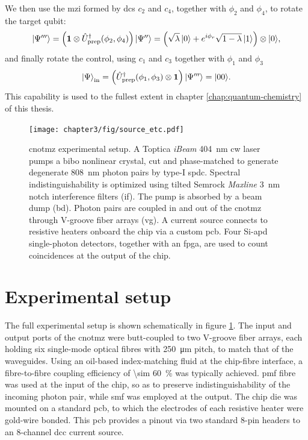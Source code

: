We then use the \gls{mzi} formed by \glspl{dc} $c_2$ and $c_4$, together with $\phi_2$ and $\phi_4$, to rotate the target qubit:
\begin{equation}
   \mbox{$ | \Psi''' \rangle $} = 
   \left(
   \mathbf{1}
   \otimes
   \hat{U}_\mathrm{prep}^\dagger(\phi_2, \phi_4) 
   \right)\mbox{$ | \Psi'' \rangle $}  
    = \left( \sqrt{\lambda} \, \mbox{$ | 0 \rangle $} 
    + e^{i \phi_r}\sqrt{1-\lambda} \, \mbox{$ | 1 \rangle $} \right) \otimes \mbox{$ | 0 \rangle $},
\end{equation}
and finally rotate the control, using $c_1$ and $c_3$ together with $\phi_1$ and $\phi_3$
\begin{equation}
    \mbox{$ | \Psi \rangle $}_{\mathrm{in}} = 
   \left( 
   \hat{U}_\mathrm{prep}^\dagger(\phi_1, \phi_3) 
   \otimes 
   \mathbf{1} 
   \right) \mbox{$ | \Psi''' \rangle $}  
   = \mbox{$ | 00 \rangle $}.
\end{equation}
This capability is used to the fullest extent in chapter \ref{chap:quantum-chemistry} of this thesis.

\begin{figure}[t!]
\centering
\texttt{[image: chapter3/fig/source\_etc.pdf]}
\caption[Experimental setup]
{ \gls{cnotmz} experimental setup.  A Toptica \emph{iBeam} \SI{404}{\nano \metre} \gls{cw} laser pumps a \gls{bibo} nonlinear crystal, cut and phase-matched to generate degenerate \SI{808}{\nano \metre} photon pairs by type-I \gls{spdc}. Spectral indistinguishability is optimized using tilted Semrock \emph{Maxline} \SI{3}{\nano \metre} notch interference filters (\acrshort{if}). The pump is absorbed by a beam dump (\acrshort{bd}). Photon pairs are coupled in and out of the \gls{cnotmz} through V-groove fiber arrays (\acrshort{vg}). A current source connects to resistive heaters onboard the chip via a custom \gls{pcb}. Four Si-\gls{apd} single-photon detectors, together with an \gls{fpga}, are used to count coincidences at the output of the chip.
}
\label{fig:cnotmz-experimental-setup}
\end{figure}

\section{Experimental setup} 
\label{sec:cnotmz-experimental-setup}
The full experimental setup is shown schematically in figure \ref{fig:cnotmz-experimental-setup}. The input and output ports of the \gls{cnotmz} were butt-coupled to two V-groove fiber arrays, each holding six single-mode optical fibres with \SI{250}{\micro \metre} pitch, to match that of the waveguides. Using an oil-based index-matching fluid at the chip-fibre interface, a fibre-to-fibre coupling efficiency of \SI{\sim 60}{\percent} was typically achieved. \Gls{pmf} fibre was used at the input of the chip, so as to preserve indistinguishability of the incoming photon pair, while \gls{smf} was employed at the output. The chip die was mounted on a standard \gls{pcb}, to which the electrodes of each resistive heater were gold-wire bonded. This \gls{pcb} provides a pinout via two standard 8-pin headers to an 8-channel \acrshort{dcc} current source.

